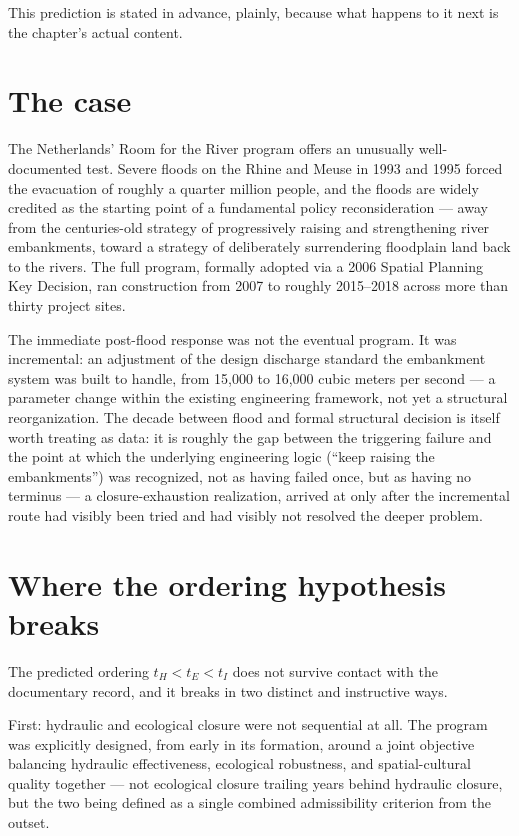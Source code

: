 This prediction is stated in advance, plainly, because what happens to it next is the chapter's actual content.

\section{The case}

The Netherlands' Room for the River program offers an unusually well-documented test. Severe floods on the Rhine and Meuse in 1993 and 1995 forced the evacuation of roughly a quarter million people, and the floods are widely credited as the starting point of a fundamental policy reconsideration --- away from the centuries-old strategy of progressively raising and strengthening river embankments, toward a strategy of deliberately surrendering floodplain land back to the rivers. The full program, formally adopted via a 2006 Spatial Planning Key Decision, ran construction from 2007 to roughly 2015--2018 across more than thirty project sites.

The immediate post-flood response was not the eventual program. It was incremental: an adjustment of the design discharge standard the embankment system was built to handle, from 15{,}000 to 16{,}000 cubic meters per second --- a parameter change within the existing engineering framework, not yet a structural reorganization. The decade between flood and formal structural decision is itself worth treating as data: it is roughly the gap between the triggering failure and the point at which the underlying engineering logic (``keep raising the embankments'') was recognized, not as having failed once, but as having no terminus --- a closure-exhaustion realization, arrived at only after the incremental route had visibly been tried and had visibly not resolved the deeper problem.

\section{Where the ordering hypothesis breaks}

The predicted ordering $t_H < t_E < t_I$ does not survive contact with the documentary record, and it breaks in two distinct and instructive ways.

First: hydraulic and ecological closure were not sequential at all. The program was explicitly designed, from early in its formation, around a joint objective balancing hydraulic effectiveness, ecological robustness, and spatial-cultural quality together --- not ecological closure trailing years behind hydraulic closure, but the two being defined as a single combined admissibility criterion from the outset.

